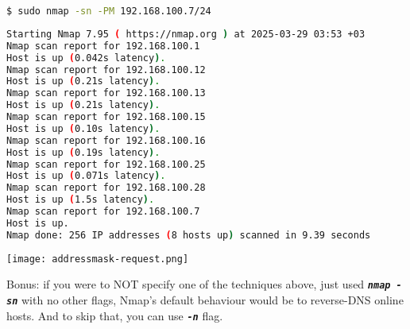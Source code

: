 \documentclass[11pt,a4paper]{article}
\newenvironment{commandbox}[1][]{
    \begin{tcolorbox}[
        colback=kalibackground,   
        colframe=commandcolor,    
        fonttitle=\bfseries\color{white},  
        title=#1,               
        breakable=true           
    ]
}{
    \end{tcolorbox}
}
\begin{document}
\begin{commandbox}[ICMP Address Mask Scan (-PM)]
\begin{lstlisting}[language=bash, style=bash, basicstyle=\small\ttfamily\color{warningcolor}]
$ sudo nmap -sn -PM 192.168.100.7/24
\end{lstlisting}

\begin{lstlisting}[basicstyle=\small\ttfamily\color{kalitext}, language=bash, style=bash, breaklines=true, breakindent=0pt]
Starting Nmap 7.95 ( https://nmap.org ) at 2025-03-29 03:53 +03
Nmap scan report for 192.168.100.1
Host is up (0.042s latency).
Nmap scan report for 192.168.100.12
Host is up (0.21s latency).
Nmap scan report for 192.168.100.13
Host is up (0.21s latency).
Nmap scan report for 192.168.100.15
Host is up (0.10s latency).
Nmap scan report for 192.168.100.16
Host is up (0.19s latency).
Nmap scan report for 192.168.100.25
Host is up (0.071s latency).
Nmap scan report for 192.168.100.28
Host is up (1.5s latency).
Nmap scan report for 192.168.100.7
Host is up.
Nmap done: 256 IP addresses (8 hosts up) scanned in 9.39 seconds
\end{lstlisting}
\end{commandbox}
\begin{center}
    \texttt{[image: addressmask-request.png]}
    \label{fig:addressmask-request}
    \end{center}

    \vspace{1em}
\begin{tcolorbox}[colback=codebackground, colframe=warningcolor]
    Bonus: if you were to NOT specify one of the techniques above, just used \texttt{\textit{\textbf{nmap -sn}}} with no other flags, Nmap's default behaviour would be to reverse-DNS online hosts. And to skip that, you can use \texttt{\textit{\textbf{-n}}} flag.
\end{tcolorbox}
\clearpage

\label{before-tcp-udp-discovery}

\clearpage  %



\end{document}
